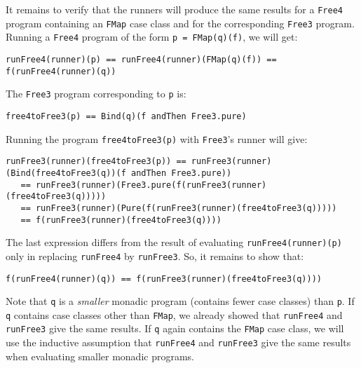 It remains to verify that the runners will produce the same results
for a \lstinline!Free4!
program containing an \lstinline!FMap!
case class and for the corresponding \lstinline!Free3!
program. Running a \lstinline!Free4!
program of the form \lstinline!p = FMap(q)(f)!,
we will get:
\begin{lstlisting}
runFree4(runner)(p) == runFree4(runner)(FMap(q)(f)) == f(runFree4(runner)(q))
\end{lstlisting}
The \lstinline!Free3! program
corresponding to \lstinline!p!
is:
\begin{lstlisting}
free4toFree3(p) == Bind(q)(f andThen Free3.pure)
\end{lstlisting}
Running the program \lstinline!free4toFree3(p)!
with \lstinline!Free3!\textsf{'}s
runner will give:
\begin{lstlisting}
runFree3(runner)(free4toFree3(p)) == runFree3(runner)(Bind(free4toFree3(q))(f andThen Free3.pure))
   == runFree3(runner)(Free3.pure(f(runFree3(runner)(free4toFree3(q)))))
   == runFree3(runner)(Pure(f(runFree3(runner)(free4toFree3(q)))))
   == f(runFree3(runner)(free4toFree3(q))))
\end{lstlisting}
The last expression differs from the result of evaluating \lstinline!runFree4(runner)(p)!
only in replacing \lstinline!runFree4!
by \lstinline!runFree3!.
So, it remains to show that:
\begin{lstlisting}
f(runFree4(runner)(q)) == f(runFree3(runner)(free4toFree3(q))))
\end{lstlisting}
Note that \lstinline!q!
is a \emph{smaller} monadic program (contains fewer case classes)
than \lstinline!p!. If
\lstinline!q! contains
case classes other than \lstinline!FMap!,
we already showed that \lstinline!runFree4!
and \lstinline!runFree3!
give the same results. If \lstinline!q!
again contains the \lstinline!FMap!
case class, we will use the inductive assumption that \lstinline!runFree4!
and \lstinline!runFree3!
give the same results when evaluating smaller monadic programs.

